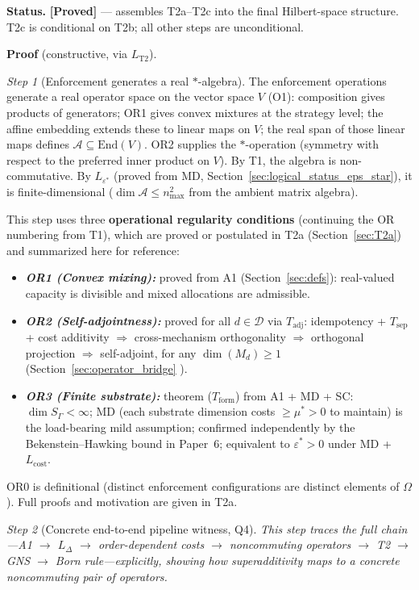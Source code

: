 \documentclass[11pt]{article}
\theoremstyle{remark}
\newenvironment{varlist}{\begin{itemize}[nosep,leftmargin=2em]}{\end{itemize}}
\begin{document}
\begin{tcolorbox}[apfbox, title={T2: Noncommutativity $\to$ Operator Algebra on Hilbert Space}]
\smallskip\noindent\textbf{Status.}  \textbf{[Proved]} --- assembles T2a--T2c into the final Hilbert-space structure.  T2c is conditional on T2b; all other steps are unconditional.

\smallskip\noindent\textbf{Proof} (constructive, via $L_{\mathrm{T2}}$).

\textit{Step 1} (Enforcement generates a real $*$-algebra).  The enforcement operations generate a real operator space on the vector space $V$ (O1): composition gives products of generators; OR1 gives convex mixtures at the strategy level; the affine embedding extends these to linear maps on $V$; the real span of those linear maps defines $\mathcal{A} \subseteq \mathrm{End}(V)$.  OR2 supplies the $*$-operation (symmetry with respect to the preferred inner product on $V$).  By T1, the algebra is non-commutative.  By $L_{\varepsilon^*}$ (proved from MD, Section~\ref{sec:logical_status_eps_star}), it is finite-dimensional ($\dim \mathcal{A} \le n_{\max}^2$ from the ambient matrix algebra).

This step uses three \textbf{operational regularity conditions} (continuing the OR numbering from T1), which are proved or postulated in T2a (Section~\ref{sec:T2a}) and summarized here for reference:
\begin{varlist}
\item \textbf{\textit{OR1 (Convex mixing):}} proved from A1 (Section~\ref{sec:defs}): real-valued capacity is divisible and mixed allocations are admissible.
\item \textbf{\textit{OR2 (Self-adjointness):}} proved for all $d \in \mathcal{D}$ via $T_{\mathrm{adj}}$: idempotency + $T_{\mathrm{sep}}$ + cost additivity $\Rightarrow$ cross-mechanism orthogonality $\Rightarrow$ orthogonal projection $\Rightarrow$ self-adjoint, for any $\dim(M_d) \ge 1$ (Section~\ref{sec:operator_bridge} ).
\item \textbf{\textit{OR3 (Finite substrate):}} theorem ($T_{\mathrm{form}}$) from A1 + MD + SC: $\dim S_\Gamma < \infty$; MD (each substrate dimension costs $\ge \mu^* > 0$ to maintain) is the load-bearing mild assumption; confirmed independently by the Bekenstein--Hawking bound in Paper~6; equivalent to $\varepsilon^* > 0$ under MD + $L_{\mathrm{cost}}$.
\end{varlist}
OR0 is definitional (distinct enforcement configurations are distinct elements of $\Omega$).  Full proofs and motivation are given in T2a.

\textit{Step 2} (Concrete end-to-end pipeline witness, Q4).  \textit{This step traces the full chain---A1 $\to$ $L_\Delta$ $\to$ order-dependent costs $\to$ noncommuting operators $\to$ T2 $\to$ GNS $\to$ Born rule---explicitly, showing how superadditivity maps to a concrete noncommuting pair of operators.}


\end{tcolorbox}
\end{document}
